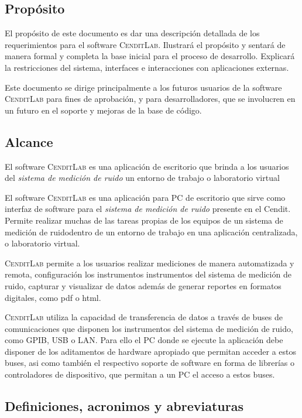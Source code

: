 \documentclass[paper=a4,oneside,fontsize=12pt]{article}
\newcommand{\AppName}{\textsc{CenditLab}\xspace}
\newcommand{\smr}{sistema de medición de ruido}
\newcommand{\cendit}{Cendit\xspace}
\begin{document}
	\subsection{Propósito}
	El propósito de este documento es dar una descripción detallada de los requerimientos para el software \AppName. Ilustrará el propósito y sentará de manera formal y completa la base inicial para el proceso de desarrollo. Explicará la restricciones del sistema, interfaces e interacciones con aplicaciones externas. 
	
	Este documento se dirige principalmente a los futuros usuarios de la software \AppName para fines de aprobación, y para desarrolladores, que se involucren en un futuro en el soporte y mejoras de la base de código.
	
	\subsection{Alcance}
	
	El software \AppName es una aplicación de escritorio que brinda a los usuarios del \emph{\smr} un entorno de trabajo o laboratorio virtual 
	
	El software \AppName es una aplicación para PC de escritorio que sirve como interfaz de software para el \emph{\smr} presente en el \cendit. Permite realizar muchas de las tareas propias de los equipos de un \smr dentro de un entorno de trabajo en una aplicación centralizada, o laboratorio virtual. 
	
	\AppName permite a los usuarios realizar mediciones de manera automatizada y remota, configuración los instrumentos instrumentos del \smr, capturar y visualizar de datos además de generar reportes en formatos digitales, como pdf o html.
	
	\AppName utiliza la capacidad de transferencia de datos a través de buses de comunicaciones que disponen los instrumentos del \smr, como GPIB, USB o LAN. Para ello el PC donde se ejecute la aplicación debe disponer de los aditamentos de hardware apropiado que permitan acceder a estos buses, asi como también el respectivo soporte de software en forma de librerías o controladores de dispositivo, que permitan a un PC el acceso a estos buses.
	
	\subsection{Definiciones, acronimos y abreviaturas}
	
\end{document}
